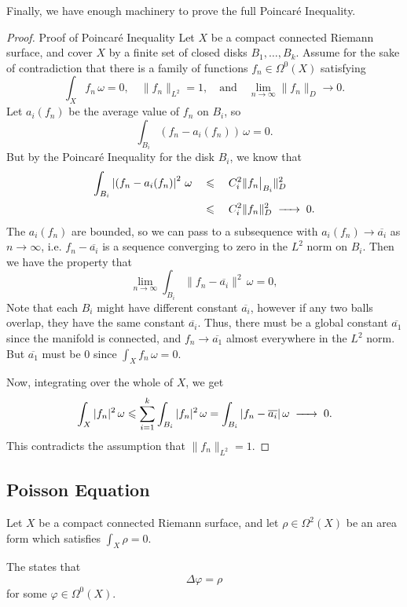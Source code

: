 \documentclass{lkx_paper}
\begin{document}
Finally, we have enough machinery to prove the full Poincar\'e Inequality.

\begin{proof}{Proof of Poincar\'e Inequality}
	Let $X$ be a compact connected Riemann surface, and cover $X$ by a finite set of closed disks $B_1,\ldots, B_k$. Assume for the sake of contradiction that there is a family of functions $f_n \in \Omega^0(X)$ satisfying
	\[
		\int_X f_n \,\omega = 0, \quad \|f_n\|_{L^2}=1,\quad\textrm{and}\quad \lim_{n\to \infty}\|f_n\|_D \to 0.
	\]
	Let $a_i(f_n)$ be the average value of $f_n$ on $B_i$, so
	\[
		\int_{B_i} \left(f_n - a_i(f_n)\right)\,\omega = 0.
	\]
	But by the Poincar\'e Inequality for the disk $B_i$, we know that
	\[
		\begin{aligned}
			\int_{B_i} \left|( f_n - a_i(f_n)\right|^2\, \omega
			\quad & \leq\quad C_i^2 \|\restr{f_n}{B_i}\|^2_D \\
			\quad & \leq\quad C_i^2 \|f_n\|_D^2 \longto 0.
		\end{aligned}
	\]
	The $a_i(f_n)$ are bounded, so we can pass to a subsequence with $a_i(f_n) \to \overline{a_i}$ as $n\to \infty$,
	i.e. $f_n-\overline{a_i}$ is a sequence converging to zero in the $L^2$ norm on $B_i$. Then we have the property that
	\[
		\lim_{n\to \infty}\int_{B_i}\| f_n - \overline{a_i}\|^2\,\omega = 0,
	\]
	Note that each $B_i$ might have different constant $\overline{a_i}$, however if any two balls overlap, they have the same constant $\overline{a_i}$. Thus, there must be a global constant $\overline{a_1}$ since the manifold is connected, and $f_n \to \overline{a_1}$ almost everywhere in the $L^2$ norm. But $\overline{a_1}$ must be $0$ since $\int_X f_n\,\omega = 0$.

	Now, integrating over the whole of $X$, we get
	\[
		\int_X |f_n|^2\,\omega \leq \sum^k_{i=1} \int_{B_i} |f_n|^2\,\omega = \int_{B_i} |f_n-\overline{a_i}|\,\omega \longto 0.
	\]
	This contradicts the assumption that $\|f_n\|_{L^2} = 1$.
\end{proof}

\subsection{Poisson Equation}

Let $X$ be a compact connected Riemann surface, and let $\rho\in \Omega^2(X)$ be an area form which satisfies $\int_X \rho = 0$.

\begin{definition}
	The  states that
	\[
		\Delta \varphi = \rho
	\]
	for some $\varphi\in \Omega^0(X)$.
\end{definition}
\end{document}

